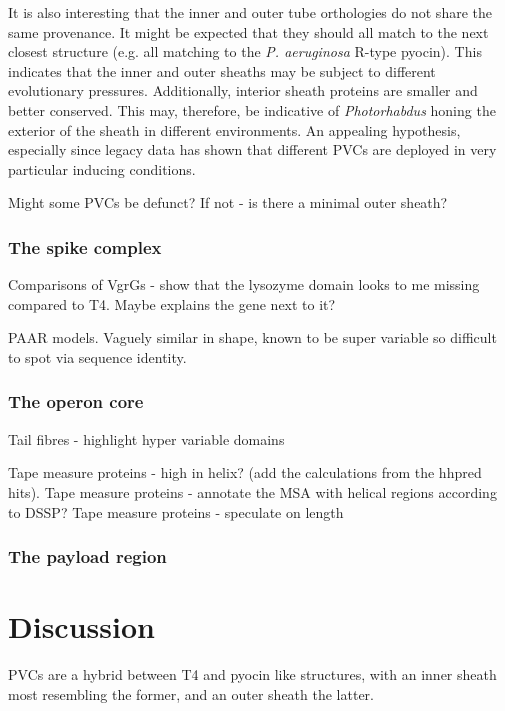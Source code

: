 
It is also interesting that the inner and outer tube orthologies do not share the same provenance. It might be expected that they should all match to the next closest structure (e.g. all matching to the \emph{P. aeruginosa} R-type pyocin). This indicates that the inner and outer sheaths may be subject to different evolutionary pressures. Additionally, interior sheath proteins are smaller and better conserved. This may, therefore, be indicative of \emph{Photorhabdus} honing the exterior of the sheath in different environments. An appealing hypothesis, especially since legacy data has shown that different PVCs are deployed in very particular inducing conditions.




Might some PVCs be defunct? If not - is there a minimal outer sheath?






\subsubsection{The spike complex}

Comparisons of VgrGs - show that the lysozyme domain looks to me missing compared to T4. Maybe explains the gene next to it?

PAAR models. Vaguely similar in shape, known to be super variable so difficult to spot via sequence identity.

\subsubsection{The operon core}
Tail fibres - highlight hyper variable domains

Tape measure proteins - high in helix? (add the calculations from the hhpred hits).
Tape measure proteins - annotate the MSA with helical regions according to DSSP?
Tape measure proteins - speculate on length

\subsubsection{The payload region}











\section{Discussion}
PVCs are a hybrid between T4 and pyocin like structures, with an inner sheath most resembling the former, and an outer sheath the latter.








